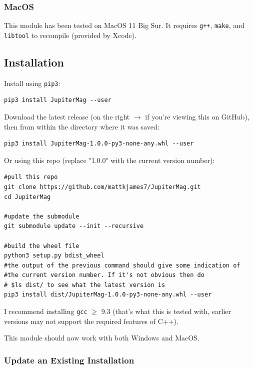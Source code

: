 	\subsubsection{MacOS}
	
		This module has been tested on MacOS 11 Big Sur. It requires \texttt{g++}, \texttt{make}, and \texttt{libtool} to recompile (provided by Xcode).
	
	\subsection{Installation}
	
		Install using \texttt{pip3}:
	
		\begin{verbatim}
pip3 install JupiterMag --user
		\end{verbatim}
	
		Download the latest release (on the right $\rightarrow$ if you're viewing this on GitHub), then from within the directory where it was saved:
	
		\begin{verbatim}
pip3 install JupiterMag-1.0.0-py3-none-any.whl --user
		\end{verbatim}
	
		Or using this repo (replace "1.0.0" with the current version number):
	
		\begin{verbatim}
#pull this repo
git clone https://github.com/mattkjames7/JupiterMag.git
cd JupiterMag
	
#update the submodule
git submodule update --init --recursive
	
#build the wheel file
python3 setup.py bdist_wheel
#the output of the previous command should give some indication of
#the current version number. If it's not obvious then do
# $ls dist/ to see what the latest version is
pip3 install dist/JupiterMag-1.0.0-py3-none-any.whl --user
		\end{verbatim}
	
		I recommend installing \texttt{gcc} $\geq$ 9.3 (that's what this is tested with, earlier versions may not support the required features of C++).
	
		This module should now work with both Windows and MacOS.
	
	\subsubsection{Update an Existing Installation}
	
